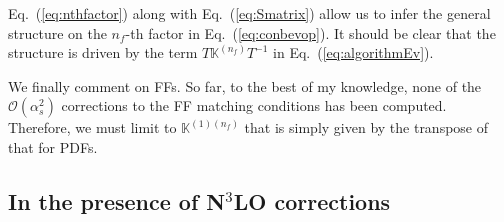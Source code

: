 \documentclass[10pt,a4paper]{article}
\begin{document}
Eq.~(\ref{eq:nthfactor}) along with Eq.~(\ref{eq:Smatrix}) allow us to
infer the general structure on the $n_f$-th factor in
Eq.~(\ref{eq:conbevop}). It should be clear that the structure is
driven by the term $T\mathbb{K}^{(n_f)}T^{-1}$ in
Eq.~(\ref{eq:algorithmEv}).

We finally comment on FFs. So far, to the best of my knowledge, none
of the $\mathcal{O}(\alpha_s^2)$ corrections to the FF matching
conditions has been computed. Therefore, we must limit to
$\mathbb{K}^{(1)(n_f)}$ that is simply given by the transpose of that
for PDFs.

\subsection{In the presence of N$^3$LO corrections}
\end{document}
